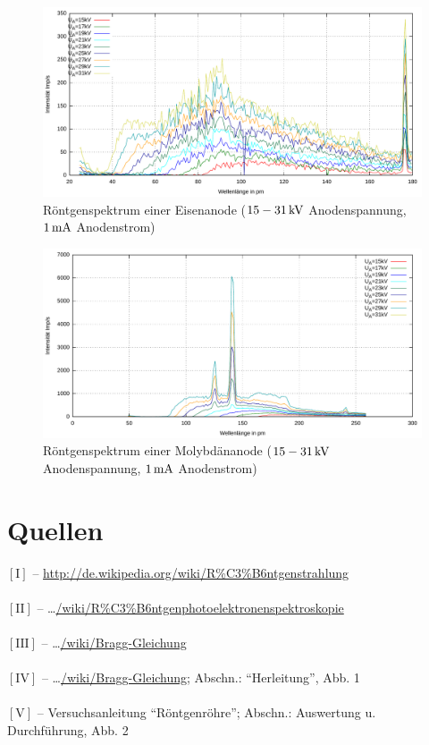 \documentclass[numbers=noenddot,12pt,a4paper]{scrartcl}
\newcommand{\num}[1]{$\left[\text{#1}\right]$}
\begin{document}
\begin{figure}[H]
	\centering
	\includegraphics[width=\textwidth]{eisenges.pdf}
	\caption{Röntgenspektrum einer Eisenanode ($\unit[15-31]{kV}$ Anodenspannung, $\unit[1]{mA}$ Anodenstrom)}
\end{figure}

\begin{figure}[H]
	\centering
	\includegraphics[width=\textwidth]{molyges.pdf}
	\caption{Röntgenspektrum einer Molybdänanode ($\unit[15-31]{kV}$ Anodenspannung, $\unit[1]{mA}$ Anodenstrom)}
\end{figure}
\newpage
\section{Quellen}
	\num{I} -- \url{http://de.wikipedia.org/wiki/R%C3%B6ntgenstrahlung}\\ \\
	\num{II} -- \dots\url{/wiki/R%C3%B6ntgenphotoelektronenspektroskopie}\\ \\
	\num{III} -- \dots\url{/wiki/Bragg-Gleichung}\\ \\
	\num{IV} -- \dots\url{/wiki/Bragg-Gleichung}; Abschn.: "`Herleitung"', Abb. 1 \\ \\
	\num{V} -- Versuchsanleitung "`Röntgenröhre"'; Abschn.: Auswertung u. Durchführung, Abb. 2
\end{document}

